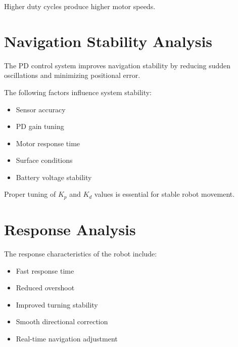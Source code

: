 \documentclass[12pt,a4paper,oneside]{report}
\begin{document}
Higher duty cycles produce higher motor speeds.


\section{Navigation Stability Analysis}

The PD control system improves navigation stability by reducing sudden oscillations and minimizing positional error.

The following factors influence system stability:

\begin{itemize}

\item Sensor accuracy

\item PD gain tuning

\item Motor response time

\item Surface conditions

\item Battery voltage stability

\end{itemize}

Proper tuning of \(K_p\) and \(K_d\) values is essential for stable robot movement.


\section{Response Analysis}

The response characteristics of the robot include:

\begin{itemize}

\item Fast response time

\item Reduced overshoot

\item Improved turning stability

\item Smooth directional correction

\item Real-time navigation adjustment

\end{itemize}
\end{document}
